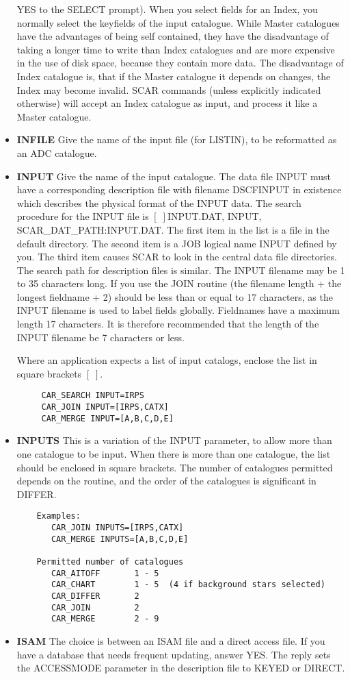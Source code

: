 \begin{itemize}
YES to the SELECT prompt).
When you select fields for an Index, you normally select the keyfields of the
input catalogue.
While Master catalogues have the advantages of being self contained, they have
the disadvantage of taking a longer time to write than Index catalogues and
are more expensive in the use of disk space, because they contain more data.
The disadvantage of Index catalogue is, that if the Master catalogue it
depends on changes, the Index may become invalid.
SCAR commands (unless explicitly indicated otherwise) will accept an Index
catalogue as input, and process it like a Master catalogue.
\item{\bf INFILE} Give the name of the input file (for LISTIN), to be
reformatted as an ADC catalogue.
\item{\bf INPUT} Give the name of the input catalogue.
The data file INPUT must have a corresponding description file
with filename DSCFINPUT in existence which describes the physical
format of the INPUT data.
The search procedure for the INPUT file is $[\;]$INPUT.DAT, INPUT,
SCAR\_DAT\_PATH:INPUT.DAT.
The first item in the list is a file in the default directory.
The second item is a JOB logical name INPUT defined by you.
The third item causes SCAR to look in the central data file directories.
The search path for description files is similar.
The INPUT filename may be 1 to 35 characters long.
If you use the JOIN routine (the filename length + the longest
fieldname + 2) should be less than or equal to 17 characters, as the INPUT
filename is used to label fields globally.
Fieldnames have a maximum length 17 characters.
It is therefore recommended that the length of the INPUT filename be 7
characters or less.

Where an application expects a list of input catalogs, enclose the
list in square brackets $[\;]$.
\begin{verbatim}
     CAR_SEARCH INPUT=IRPS
     CAR_JOIN INPUT=[IRPS,CATX]
     CAR_MERGE INPUT=[A,B,C,D,E]
\end{verbatim}
\item{\bf INPUTS} This is a variation of the INPUT parameter, to allow
more than one catalogue to be input.
When there is more than one catalogue, the list should be enclosed in
square brackets.
The number of catalogues permitted depends on the routine, and the order
of the catalogues is significant in DIFFER.
\begin{verbatim}
    Examples:
       CAR_JOIN INPUTS=[IRPS,CATX]
       CAR_MERGE INPUTS=[A,B,C,D,E]

    Permitted number of catalogues
       CAR_AITOFF       1 - 5
       CAR_CHART        1 - 5  (4 if background stars selected)
       CAR_DIFFER       2
       CAR_JOIN         2
       CAR_MERGE        2 - 9
\end{verbatim}
\item{\bf ISAM} The choice is between an ISAM file and a direct access file.
If you have a database that needs frequent updating, answer YES.
The reply sets the ACCESSMODE parameter in the description file to KEYED or
DIRECT.


\end{itemize}
